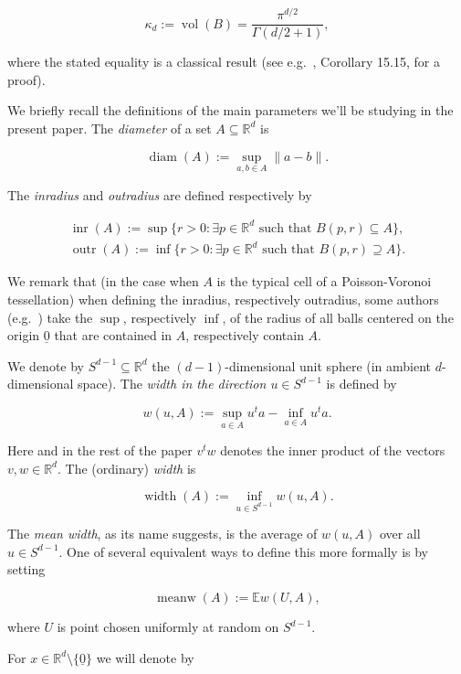 \documentclass[11pt]{article}%
\newcommand{\eR}[0]{\ensuremath{ \mathbb R}}
\newcommand{\norm}[1]{\ensuremath{\|#1\|}}
\newcommand{\Ee}[0]{\ensuremath{{\mathbb E}}}
\newcommand{\orig}{\underline{0}}
\DeclareMathOperator{\vol}{vol}
\DeclareMathOperator{\diam}{diam}
\DeclareMathOperator{\inr}{inr}
\DeclareMathOperator{\outr}{outr}
\DeclareMathOperator{\meanw}{meanw}
\DeclareMathOperator{\width}{width}
\begin{document}
\begin{equation}\label{eq:volball} 
\kappa_d := \vol( B ) = \frac{\pi^{d/2}}{\Gamma(d/2+1)},  
\end{equation}

\noindent
where the stated equality is a classical result (see e.g.~\cite{Schilling}, Corollary 15.15, for a proof).

We briefly recall the definitions of the main parameters we'll be studying in the present paper.
The {\em diameter} of a set $A \subseteq \eR^d$ is

$$ \diam(A) := \sup_{a,b\in A} \norm{a-b}. $$

\noindent
The {\em inradius} and {\em outradius} are defined respectively by

$$ \begin{array}{l} 
\inr(A) := \sup \{ r > 0 : \text{$\exists p \in \eR^d$ such that $B(p,r) \subseteq A$}\}, \\
\outr(A) := \inf \{ r > 0 : \text{$\exists p \in \eR^d$ such that $B(p,r) \supseteq A$}\}.    
\end{array} $$

\noindent
We remark that (in the case when $A$ is the typical cell of 
a Poisson-Voronoi tessellation) when defining the inradius, respectively outradius, 
some authors (e.g.~\cite{CalkaChevanier}) take the $\sup$, respectively $\inf$, 
of the radius of all balls centered on the origin $\orig$ that are contained in $A$, respectively contain $A$.

We denote by $S^{d-1} \subseteq \eR^d$ the $(d-1)$-dimensional unit sphere (in ambient $d$-dimensional space).
The {\em width in the direction $u \in S^{d-1}$} is defined by

$$ w(u,A) := \sup_{a\in A} u^t a - \inf_{a\in A} u^t a. $$

\noindent
Here and in the rest of the paper $v^t w$ denotes the inner product of the vectors $v,w \in \eR^d$.
The (ordinary) {\em width} is 

$$ \width(A) := \inf_{u\in S^{d-1}} w(u,A). $$

\noindent
The {\em mean width}, as its name suggests, is the average of $w(u,A)$ over all $u \in S^{d-1}$. 
One of several equivalent ways to define this more formally is by setting

$$ \meanw(A) := \Ee w(U,A), $$

\noindent
where $U$ is point chosen uniformly at random on $S^{d-1}$.

For $x \in \eR^d \setminus \{\orig\}$ we will denote by 
\end{document}
